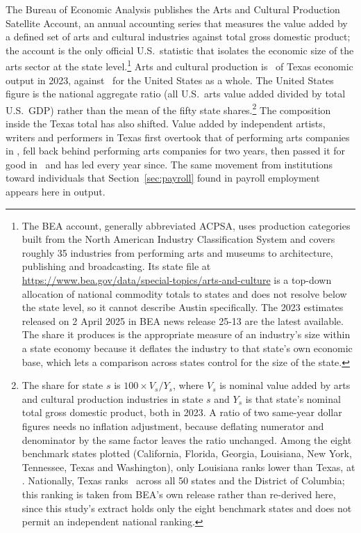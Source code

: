 The Bureau of Economic Analysis publishes the Arts and Cultural Production
Satellite Account, an annual accounting series that measures the value added
by a defined set of arts and cultural industries against total gross domestic
product; the account is the only official U.S.\ statistic that isolates the
economic size of the arts sector at the state
level.\footnote{The BEA account, generally abbreviated ACPSA, uses production
categories built from the North American Industry Classification System and
covers roughly 35 industries from performing arts and museums to
architecture, publishing and broadcasting. Its state file at
\url{https://www.bea.gov/data/special-topics/arts-and-culture} is a
top-down allocation of national commodity totals to states and does not
resolve below the state level, so it cannot describe Austin specifically. The
2023 estimates released on 2 April 2025 in BEA news release 25-13 are the
latest available. The share it produces is the appropriate measure of an
industry's size within a state economy because it deflates the industry to
that state's own economic base, which lets a comparison across states control
for the size of the state.} Arts and cultural production is
\NBeaGdpShareTxTwoZeroTwoThree\ of Texas economic output in 2023, against
\NBeaGdpShareUsAvgTwoZeroTwoThree\ for the United States as a whole. The
United States figure is the national aggregate ratio (all U.S.\ arts value
added divided by total U.S.\ GDP) rather than the mean of the fifty state
shares.\footnote{The share for state \(s\) is
\(100 \times V_s / Y_s\), where \(V_s\) is nominal value added by arts and
cultural production industries in state \(s\) and \(Y_s\) is that state's
nominal total gross domestic product, both in 2023. A ratio of two same-year
dollar figures needs no inflation adjustment, because deflating numerator and
denominator by the same factor leaves the ratio unchanged. Among the eight
benchmark states plotted (California, Florida, Georgia, Louisiana, New York,
Tennessee, Texas and Washington), only Louisiana ranks lower than Texas, at
\NBeaGdpShareLaTwoZeroTwoThree. Nationally, Texas ranks
\NBeaGdpShareTxNationalRank\ across all 50 states and the District of
Columbia; this ranking is taken from BEA's own release rather than re-derived
here, since this study's extract holds only the eight benchmark states and
does not permit an independent national ranking.} The composition inside the
Texas total has also shifted. Value added by independent artists, writers and
performers in Texas first overtook that of performing arts companies in
\NBeaFirstCrossoverYearTx, fell back behind performing arts companies for two
years, then passed it for good in \NBeaCrossoverYearTx\ and has led every year
since. The same movement from institutions toward individuals that
Section~\ref{sec:payroll} found in payroll employment appears here in output.

